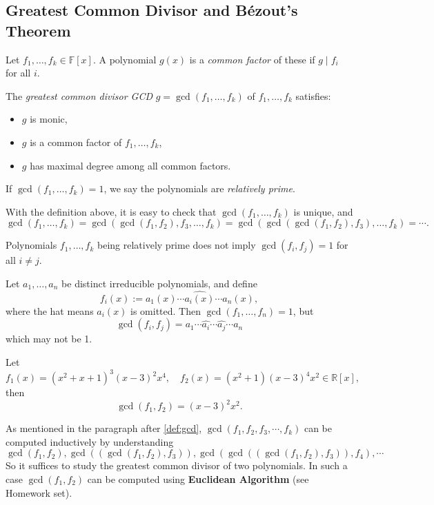 \subsection{Greatest Common Divisor and B\'ezout's Theorem}
\begin{definition} \label{def:gcd}
Let \(f_1, \dots, f_k \in \mathbb{F}[x]\). A polynomial \(g(x)\) is a \emph{common factor} of these if \(g \mid f_i\) for all \(i\).

The \emph{greatest common divisor {GCD}} \(g = \gcd(f_1, \dots, f_k)\) of $f_1, \dots, f_k$ satisfies:
\begin{itemize}
    \item \(g\) is monic,
    \item \(g\) is a common factor of \(f_1, \dots, f_k\),
    \item \(g\) has maximal degree among all common factors.
\end{itemize}
If \(\gcd(f_1, \dots, f_k) = 1\), we say the polynomials are \emph{relatively prime}.
\end{definition}
With the definition above, it is easy to check that \(\gcd(f_1, \dots, f_k)\) is unique, and 
\[\gcd(f_1, \dots, f_k) = \gcd(\gcd(f_1, f_2), f_3, \dots, f_k) = \gcd(\gcd(\gcd(f_1, f_2), f_3), \dots, f_k) = \cdots.\]


\begin{remark}
Polynomials \(f_1, \dots, f_k\) being relatively prime does not imply \(\gcd(f_i, f_j) = 1\) for all \(i \neq j\).
\end{remark}

\begin{example}
Let \(a_1, \dots, a_n\) be distinct irreducible polynomials, and define
\[
f_i(x) := a_1(x) \cdots \widehat{a_i(x)} \cdots a_n(x),
\]
where the hat means \(a_i(x)\) is omitted. Then \(\gcd(f_1, \dots, f_n) = 1\), but
\[
\gcd(f_i, f_j) = a_1 \cdots \widehat{a_i} \cdots \widehat{a_j} \cdots a_n
\]
which may not be 1.
\end{example}

\begin{example}
Let 
\[
f_1(x) = (x^2 + x + 1)^3 (x - 3)^2 x^4, \quad
f_2(x) = (x^2 + 1)(x - 3)^4 x^2 \in \mathbb{R}[x],
\]
then
\[
\gcd(f_1, f_2) = (x - 3)^2 x^2.
\]
\end{example}


As mentioned in the paragraph after \autoref{def:gcd}, \(\gcd(f_1, f_2, f_3, \cdots,f_k)\) can be computed inductively by understanding
$$\gcd(f_1, f_2), \gcd((\gcd(f_1,f_2),f_3)), \gcd(\gcd((\gcd(f_1,f_2),f_3)),f_4), \cdots$$
So it suffices to study the greatest common divisor of two polynomials. In such a case $\gcd(f_1, f_2)$ can be computed using {\bf Euclidean Algorithm} (see Homework set).

